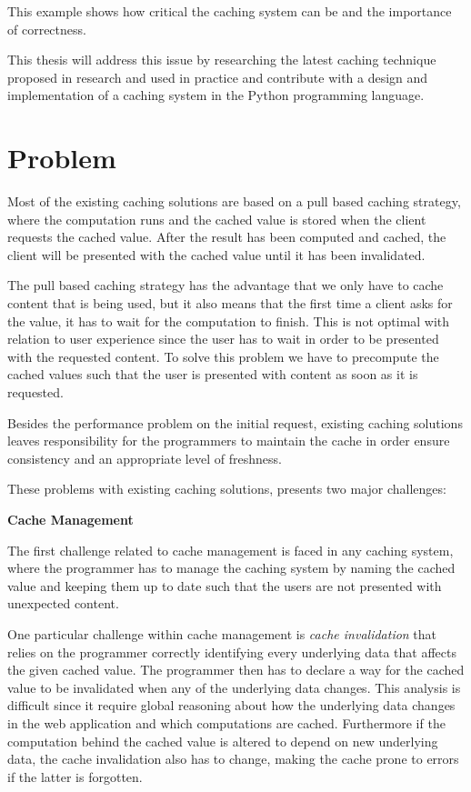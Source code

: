 This example shows how critical the caching system can be and the importance of correctness.

This thesis will address this issue by researching the latest caching technique proposed in research and used in practice and contribute with a design and implementation of a caching system in the Python programming language.

\section{Problem}
\label{sec:problem}

Most of the existing caching solutions are based on a pull based caching strategy, where the computation runs and the cached value is stored when the client requests the cached value. After the result has been computed and cached, the client will be presented with the cached value until it has been invalidated.

The pull based caching strategy has the advantage that we only have to cache content that is being used, but it also means that the first time a client asks for the value, it has to wait for the computation to finish. This is not optimal with relation to user experience since the user has to wait in order to be presented with the requested content. To solve this problem we have to precompute the cached values such that the user is presented with content as soon as it is requested.

Besides the performance problem on the initial request, existing caching solutions leaves responsibility for the programmers to maintain the cache in order ensure consistency and an appropriate level of freshness.

These problems with existing caching solutions, presents two major challenges:

\textbf{Cache Management}

The first challenge related to cache management is faced in any caching system, where the programmer has to manage the caching system by naming the cached value and keeping them up to date such that the users are not presented with unexpected content.

One particular challenge within cache management is \emph{cache invalidation} that relies on the programmer correctly identifying every underlying data that affects the given cached value. The programmer then has to declare a way for the cached value to be invalidated when any of the underlying data changes. This analysis is difficult since it require global reasoning about how the underlying data changes in the web application and which computations are cached. Furthermore if the computation behind the cached value is altered to depend on new underlying data, the cache invalidation also has to change, making the cache prone to errors if the latter is forgotten.


